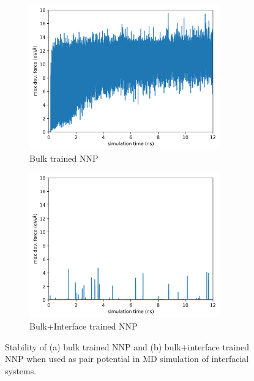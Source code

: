 \begin{figure}[tbhp]
	\centering
	\begin{subfigure}{0.48\textwidth}
		\centering

		\includegraphics[width=0.9\textwidth]{images/deviation_bulk}
		\caption{Bulk trained NNP}
		\label{fig:dev_bulk}
	\end{subfigure}
	\hfill
	\begin{subfigure}{0.48\textwidth}
		\centering

		\includegraphics[width=0.9\textwidth]{images/deviation_bulk+interface}
		\caption{Bulk+Interface trained NNP}
		\label{fig:dev_bulk_interface}
	\end{subfigure}

	\caption{Stability of (a) bulk trained NNP and (b) bulk+interface
		trained NNP when used as pair potential in MD simulation of
		interfacial
		systems. }
	\label{fig:model_dev}
\end{figure}

